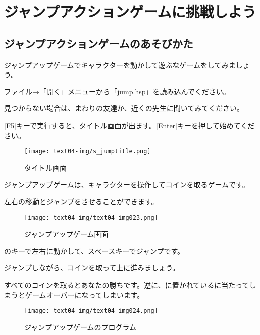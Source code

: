 \newpage

\section{ジャンプアクションゲームに挑戦しよう}


\subsection{ジャンプアクションゲームのあそびかた}



ジャンプアップゲームでキャラクターを動かして遊ぶなゲームをしてみましょう。


ファイル→「開く」メニューから「jump.hsp」を読み込んでください。

見つからない場合は、まわりの友達か、近くの先生に聞いてみてください。

[F5]キーで実行すると、タイトル画面が出ます。[Enter]キーを押して始めてください。


\begin{figure}[H]
    \begin{center}
      \texttt{[image: text04-img/s\_jumptitle.png]}
      \caption{タイトル画面}
    \end{center}
    \label{fig:prog_menu}
\end{figure}

ジャンプアップゲームは、キャラクターを操作してコインを取るゲームです。

左右の移動とジャンプをさせることができます。



\begin{figure}[H]
    \begin{center}
      \texttt{[image: text04-img/text04-img023.png]}
      \caption{ジャンプアップゲーム画面}
    \end{center}
    \label{fig:prog_menu}
\end{figure}

のキーで左右に動かして、スペースキーでジャンプです。

ジャンプしながら、コインを取って上に進みましょう。

すべてのコインを取るとあなたの勝ちです。逆に、に置かれているに当たってしまうとゲームオーバーになってしまいます。


\begin{figure}[H]
    \begin{center}
      \texttt{[image: text04-img/text04-img024.png]}
      \caption{ジャンプアップゲームのプログラム}
    \end{center}
    \label{fig:prog_menu}
\end{figure}

